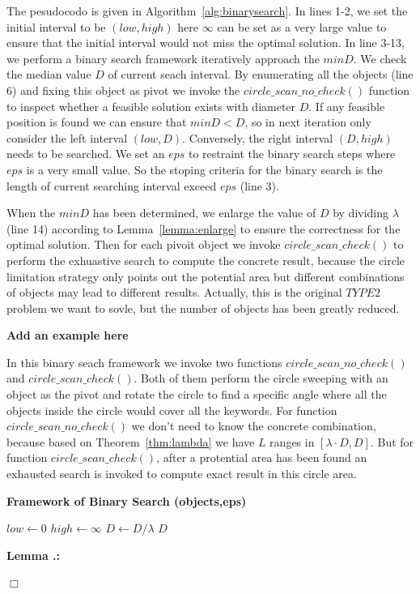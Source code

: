 \documentclass{sig-alternate}
\newcounter{example}[section]
\newcounter{theorem}[section]
\renewcommand{\thetheorem}{\nthesection.\arabic{theorem}}
\newenvironment{lemma}{\begin{em}
    \refstepcounter{theorem}
    {\vspace{1ex} \noindent\bf  Lemma  \thetheorem:}}{
    \end{em}\eop\vspace{1ex}} %
\newcommand{\nthesection}{\arabic{section}}
\newcommand{\eop}{\hspace*{\fill}\mbox{$\Box$}}
\begin{document}
The pesudocodo is given in Algorithm~\ref{alg:binarysearch}. In lines 1-2,
we set the initial interval to be $(low, high)$ here $\infty$ can be set as a very
large value to ensure that the initial interval would not miss the optimal solution.
In line 3-13, we perform a binary search framework iteratively approach the $minD$.
We check the median value $D$ of current seach interval. By enumerating all the objects (line 6)
and fixing this object as pivot we invoke the $circle\_scan\_no\_check()$ function
to inspect whether a feasible solution exists with diameter $D$.
If any feasible position is found we can ensure that $minD < D$, so in next iteration
only consider the left interval $(low,D)$. Conversely, the right interval $(D,high)$
needs to be searched. We set an $eps$ to restraint the binary search steps where
$eps$ is a very small value. So the stoping criteria for the binary search is the length
of current searching interval exceed $eps$ (line 3). 

When the $minD$ has been determined, we enlarge the value of $D$ by dividing $\lambda$
(line 14) according to Lemma~\ref{lemma:enlarge} to ensure the correctness for the optimal
solution. Then for each pivoit object we invoke $circle\_scan\_check()$ to perform
the exhuastive search to compute the concrete result, because the circle limitation strategy
only points out the potential area but different combinations of objects may lead to
different results. Actually, this is the original $TYPE2$ problem we want to sovle, but
the number of objects has been greatly reduced.

\textbf{Add an example here}

In this binary seach framework
we invoke two functions $circle\_scan\_no\_check()$ and $circle\_scan\_check()$.
Both of them perform the circle sweeping with an object as the pivot and rotate the
circle to find a specific angle where all the objects inside the circle would
cover all the keywords. For function $circle\_scan\_no\_check()$ we don't need to
know the concrete combination, because based on Theorem~\ref{thm:lambda} we have
$L$ ranges in $[\lambda\cdot D, D]$.
But for function $circle\_scan\_check()$, after a protential area has been found
an exhausted search is invoked to compute exact result in this circle area.

\begin{algorithm}[!ht]\small\label{alg:binarysearch}
\caption{ \bf {Framework of Binary Search} (objects,eps)}

$low \gets 0$\;
$high \gets \infty$\;
$D \gets D/\lambda$\;
\Return $D$\;\vspace{-1ex}

\end{algorithm}

\begin{lemma}\label{lemma:2R}

\end{lemma}
\end{document}
